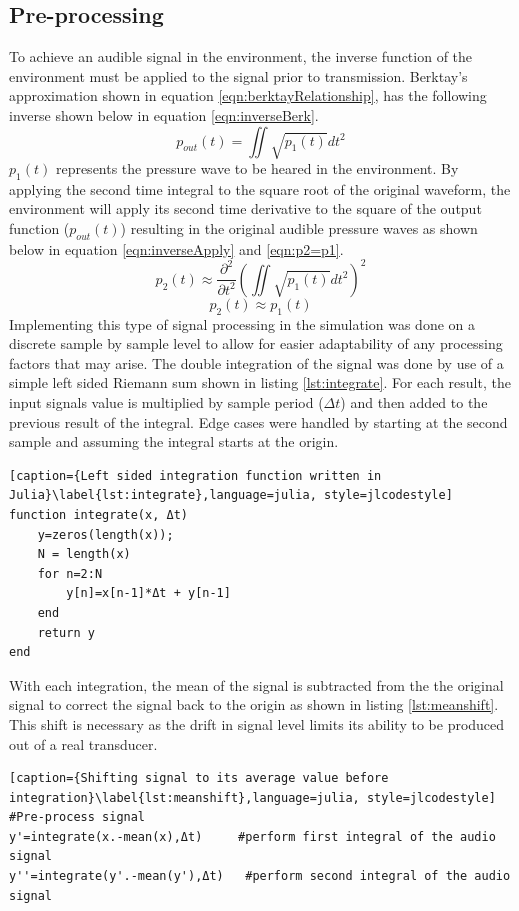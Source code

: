 \subsection{Pre-processing}
To achieve an audible signal in the environment, the inverse function of the environment must be applied to the signal prior to transmission. Berktay's approximation \cite{berktay_1965} shown in equation \ref{eqn:berktayRelationship}, has the following inverse shown below in equation \ref{eqn:inverseBerk}.
\begin{equation}
    p_{out}(t) = \iint \sqrt{p_1(t)} dt^2
    \label{eqn:inverseBerk}
\end{equation}
$p_1(t)$ represents the pressure wave to be heared in the environment. By applying the second time integral to the square root of the original waveform, the environment will apply its second time derivative to the square of the output function ($p_{out}(t)$) resulting in the original audible pressure waves as shown below in equation \ref{eqn:inverseApply} and \ref{eqn:p2=p1}.
\begin{equation}
        p_2(t) \approx \frac{\partial^2}{\partial t^2}\left(\iint \sqrt{p_1(t)} dt^2\right)^2
        \label{eqn:inverseApply}
\end{equation}
\begin{equation}
        p_2(t) \approx p_1(t)
        \label{eqn:p2=p1}
\end{equation}
\newpage
Implementing this type of signal processing in the simulation was done on a discrete sample by sample level to allow for easier adaptability of any processing factors that may arise. The double integration of the signal was done by use of a simple left sided Riemann sum shown in listing \ref{lst:integrate}. For each result, the input signals value is multiplied by sample period ($\Delta t$) and then added to the previous result of the integral. Edge cases were handled by starting at the second sample and assuming the integral starts at the origin.
\begin{lstlisting}[caption={Left sided integration function written in Julia}\label{lst:integrate},language=julia, style=jlcodestyle]
function integrate(x, Δt)
    y=zeros(length(x));
    N = length(x)
    for n=2:N
        y[n]=x[n-1]*Δt + y[n-1]
    end
    return y
end
\end{lstlisting}
With each integration, the mean of the signal is subtracted from the the original signal to correct the signal back to the origin as shown in listing \ref{lst:meanshift}. This shift is necessary as the drift in signal level limits its ability to be produced out of a real transducer.
\begin{lstlisting}[caption={Shifting signal to its average value before integration}\label{lst:meanshift},language=julia, style=jlcodestyle]
#Pre-process signal             
y'=integrate(x.-mean(x),Δt)     #perform first integral of the audio signal
y''=integrate(y'.-mean(y'),Δt)   #perform second integral of the audio signal
\end{lstlisting}

